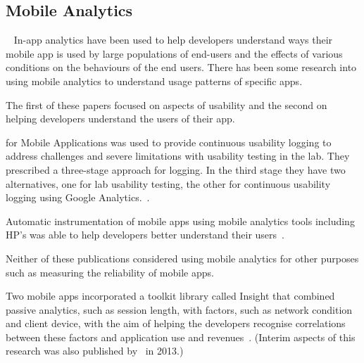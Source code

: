 \subsection{Mobile Analytics}~\label{rw-mobile-analytics-topic}
In-app analytics have been used to help developers understand ways their mobile app is used by large populations of end-users and the effects of various conditions on the behaviours of the end users. There has been some research into using mobile analytics to understand usage patterns of specific apps.

The first of these papers focused on aspects of usability and the second on helping developers understand the users of their app.

 for Mobile Applications was used to provide continuous usability logging to address challenges and severe limitations with usability testing in the lab. They prescribed a three-stage approach for logging. In the third stage they have two alternatives, one for lab usability testing, the other for continuous usability logging using Google Analytics.~.

Automatic instrumentation of mobile apps using mobile analytics tools including HP's  was able to help developers better understand their users~.

Neither of these publications considered using mobile analytics for other purposes such as measuring the reliability of mobile apps.

Two mobile apps incorporated a toolkit library called Insight that combined passive analytics, such as session length, with factors, such as network condition and client device, with the aim of helping the developers recognise correlations between these factors and application use and revenues~. (Interim aspects of this research was also published by~ in 2013.)

